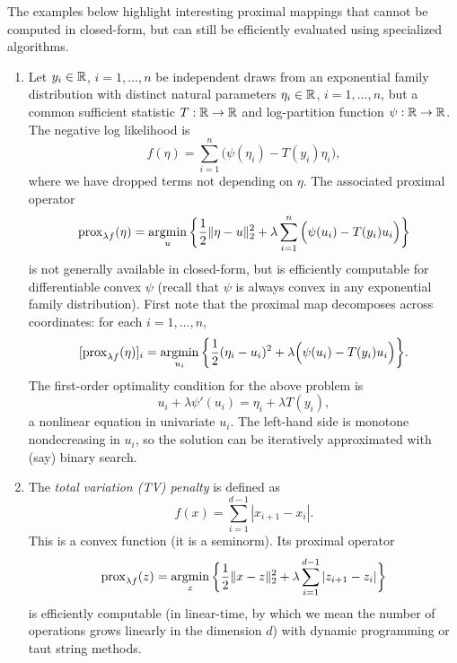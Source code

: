 \begin{Example}
\label{xa:proximal_mappings_efficient}
The examples below highlight interesting proximal mappings that cannot be 
computed in closed-form, but can still be efficiently evaluated using
specialized  algorithms.     

\begin{enumerate}[label=\alph*., ref=\alph*]
\item Let $y_i \in \mathbb{R}$, $i = 1,\ldots,n$ be independent draws from an
  exponential family distribution with distinct natural parameters $\eta_i \in
  \mathbb{R}$, $i=1,\ldots,n$, but a common sufficient statistic $T : \mathbb{R} \to \mathbb{R}$ and
  log-partition function $\psi : \mathbb{R} \to \mathbb{R}$. The negative log likelihood 
  is       
  \[
  f(\eta) = \sum_{i=1}^n \Big( \psi(\eta_i) - T(y_i) \eta_i \Big),
  \]
  where we have dropped terms not depending on $\eta$. The associated proximal
  operator 
  \[
  \operatorname{prox}_{\lambda f}(\eta) = \operatorname*{argmin}_{u} \bigg\{ \frac{1}{2} \|\eta - u\|_2^2 +
  \lambda \sum_{i=1}^n \Big( \psi(u_i) - T(y_i) u_i \Big) \bigg\}
  \]
  is not generally available in closed-form, but is efficiently computable for
  differentiable convex $\psi$ (recall that $\psi$ is always convex in any
  exponential family distribution). First note that the proximal map decomposes
  across coordinates: for each $i=1,\ldots,n$,    
  \[
  [\operatorname{prox}_{\lambda f}(\eta)]_i = \operatorname*{argmin}_{u_i} \bigg\{ \frac{1}{2} (\eta_i -
  u_i)^2 + \lambda \Big( \psi(u_i) - T(y_i) u_i \Big) \bigg\}. 
  \]
  The first-order optimality condition for the above problem is 
  \[
  u_i + \lambda \psi'(u_i) = \eta_i + \lambda T(y_i),
  \]
  a nonlinear equation in univariate $u_i$. The left-hand side is monotone
  nondecreasing in $u_i$, so the solution can be iteratively approximated with
  (say) binary search.       

\item {}
  The \emph{total variation (TV) penalty} is defined as
  \begin{equation}
  \label{eq:tv}
  f(x) = \sum_{i=1}^{d-1} |x_{i+1} - x_i|.
  \end{equation}
  This is a convex function (it is a seminorm). Its proximal operator    
  \[
  \operatorname{prox}_{\lambda f}(z) = \operatorname*{argmin}_z \bigg\{ \frac{1}{2} \|x - z\|_2^2 + 
  \lambda \sum_{i=1}^{d-1} |z_{i+1} - z_i| \bigg\}
  \]
  is efficiently computable (in linear-time, by which we mean the number of
  operations grows linearly in the dimension $d$) with dynamic programming or  
  taut string methods.       


\end{enumerate}
\end{Example}
